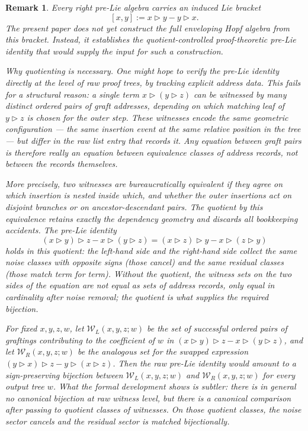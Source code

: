 \documentclass[11pt]{article}
\newtheorem{remark}[theorem]{Remark}
\begin{document}
\begin{remark}
Every right pre-Lie algebra carries an induced Lie bracket
\[
[x,y] := x\triangleright y - y\triangleright x.
\]
The present paper does not yet construct the full enveloping Hopf algebra from
this bracket. Instead, it establishes the quotient-controlled proof-theoretic
pre-Lie identity that would supply the input for such a construction.

\medskip
\noindent\textit{Why quotienting is necessary.}
One might hope to verify the pre-Lie identity directly at the level of
raw proof trees, by tracking explicit address data.  This fails for a
structural reason: a single term $x\triangleright(y\triangleright z)$ can be
\emph{witnessed} by many distinct ordered pairs of graft addresses, depending on
which matching leaf of $y\triangleright z$ is chosen for the outer step. These
witnesses encode the same geometric configuration --- the same insertion event
at the same relative position in the tree --- but differ in the raw list entry
that records it.  Any equation between graft pairs is therefore really an
equation between \emph{equivalence classes} of address records, not between the
records themselves.

More precisely, two witnesses are \emph{bureaucratically equivalent}
if they agree on which insertion is nested inside which, and whether the
outer insertions act on disjoint branches or on ancestor-descendant
pairs.  The quotient by this equivalence retains exactly the dependency
geometry and discards all bookkeeping accidents.  The pre-Lie identity
\[
(x\triangleright y)\triangleright z - x\triangleright(y\triangleright z)
=
(x\triangleright z)\triangleright y - x\triangleright(z\triangleright y)
\]
holds in this quotient: the left-hand side and the right-hand side
collect the \emph{same} noise classes with opposite signs (those
cancel) and the same residual classes (those match term for term).
Without the quotient, the witness sets on the two sides of the equation
are not equal as sets of address records, only equal in cardinality
after noise removal; the quotient is what supplies the required
bijection.

For fixed \(x,y,z,w\), let \(\mathcal W_L(x,y,z;w)\) be the set of successful
ordered pairs of graftings contributing to the coefficient of \(w\) in
\((x\triangleright y)\triangleright z - x\triangleright(y\triangleright z)\),
and let \(\mathcal W_R(x,y,z;w)\) be the analogous set for the swapped
expression
\((y\triangleright x)\triangleright z - y\triangleright(x\triangleright z)\).
Then the raw pre-Lie identity would amount to a sign-preserving bijection
between \(\mathcal W_L(x,y,z;w)\) and \(\mathcal W_R(x,y,z;w)\) for every
output tree \(w\). What the formal development shows is subtler: there is in
general no canonical bijection at raw witness level, but there is a canonical
comparison after passing to quotient classes of witnesses. On those quotient
classes, the noise sector cancels and the residual sector is matched
bijectionally.
\end{remark}
\end{document}
